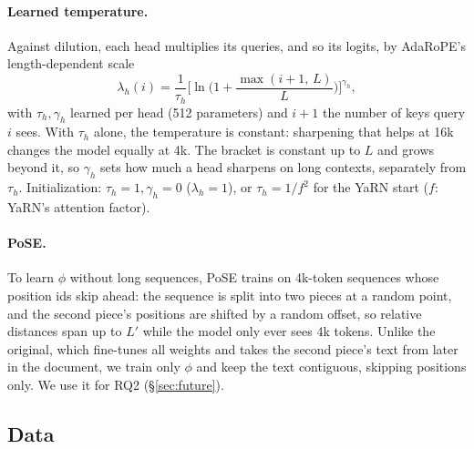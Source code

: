 \documentclass[11pt]{article}
\begin{document}
\paragraph{Learned temperature.} Against dilution, each head multiplies its queries, and so its logits, by AdaRoPE's
length-dependent scale
\begin{equation}
\lambda_h(i) = \frac{1}{\tau_h}\Big[\ln\Big(1 + \frac{\max(i+1,\,L)}{L}\Big)\Big]^{\gamma_h},
\end{equation}
with $\tau_h, \gamma_h$ learned per head (512 parameters) and $i+1$ the number of keys query $i$ sees. With $\tau_h$ alone, the temperature is constant: sharpening that helps at 16k changes the model equally at 4k. The bracket is constant up to $L$ and grows beyond it, so $\gamma_h$ sets how much a head sharpens on long contexts, separately from $\tau_h$. Initialization: $\tau_h = 1, \gamma_h = 0$ ($\lambda_h = 1$), or $\tau_h = 1/f^2$ for the YaRN start ($f$: YaRN's attention factor).

\paragraph{PoSE.} To learn $\phi$ without long sequences, PoSE \citep{zhu2024pose} trains on 4k-token sequences whose position ids skip ahead: the sequence is split into two pieces at a random point, and the second piece's positions are shifted by a random offset, so relative distances span up to $L'$ while the model only ever sees 4k tokens. Unlike the original, which fine-tunes all weights and takes the second piece's text from later in the document, we train only $\phi$ and keep the text contiguous, skipping positions only. We use it for RQ2 (\S\ref{sec:future}).

\subsection{Data}
\label{sec:data}
\end{document}
